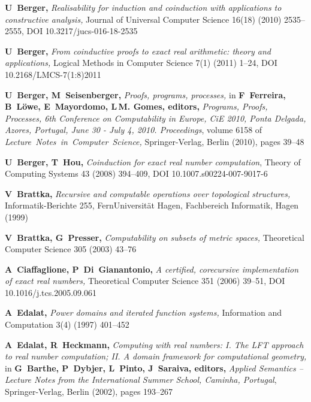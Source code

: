 \documentclass[microtype]{jloganal}
\theoremstyle{plain}
\theoremstyle{definition}
\begin{document}
\begin{thebibliography}{MRE07}

\textbf{U~Berger,}
\newblock \emph{Realisability for induction and coinduction with applications to
  constructive analysis,}
\newblock Journal of Universal Computer Science 16(18) (2010) 2535--2555, DOI 10.3217/jucs-016-18-2535

\textbf{U~Berger,}
\newblock \emph{From coinductive proofs to exact real arithmetic: theory and
  applications,}
\newblock Logical Methods in Computer Science 7(1) (2011) 1--24, DOI 10.2168/LMCS-7(1:8)2011

\textbf{U~Berger, M~Seisenberger,}
\newblock \emph{Proofs, programs, processes,}
\newblock in \textbf{F~Ferreira, B~L\"owe, E~Mayordomo, L\,M. Gomes, editors,}
  {\em Programs, Proofs, Processes, 6th Conference on Computability in Europe,
  CiE 2010, Ponta Delgada, Azores, Portugal, June 30 - July 4, 2010.
  Proceedings}, volume 6158 of \emph{Lecture~Notes~in~Computer~Science,} Springer-Verlag, Berlin (2010), pages
  39--48

\textbf{U~Berger, T~Hou,}
\newblock \emph{Coinduction for exact real number computation},
\newblock Theory of Computing Systems 43 (2008) 394--409, DOI 10.1007.s00224-007-9017-6
  
\textbf{V~Brattka,}
\newblock \emph{Recursive and computable operations over topological structures,} Informatik-Berichte 255, FernUniversit\"at Hagen, Fachbereich Informatik, Hagen (1999)

\textbf{V~Brattka, G~Presser,}
\newblock \emph{Computability on subsets of metric spaces,}
\newblock Theoretical Computer Science 305 (2003) 43--76

\textbf{A~Ciaffaglione, P~Di~Gianantonio,}
\newblock \emph{A certified, corecursive implementation of exact real numbers,}
\newblock Theoretical Computer Science 351 (2006) 39--51, DOI 10.1016/j.tcs.2005.09.061

\textbf{A~Edalat,}
\newblock \emph{Power domains and iterated function systems,}
\newblock Information and Computation 3(4) (1997) 401--452

\textbf{A~Edalat, R~Heckmann,}
\newblock \emph{Computing with real numbers: I. {T}he {LFT} approach to real number
  computation; {II.} {A} domain framework for computational geometry,}
\newblock in \textbf{G~Barthe, P~Dybjer, L~Pinto, J~Saraiva, editors,} \emph{
  Applied Semantics -- Lecture Notes from the International Summer School,
  Caminha, Portugal}, Springer-Verlag, Berlin (2002), pages 193--267
  

\end{thebibliography}
\end{document}
